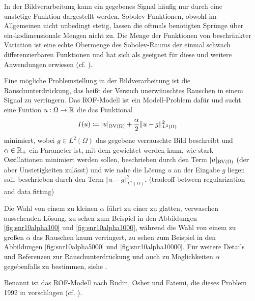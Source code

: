 In der Bildverarbeitung kann ein gegebenes Signal häufig nur durch eine
unstetige Funktion dargestellt werden.
Sobolev-Funktionen, obwohl im Allgemeinen nicht unbedingt stetig,
lassen die oftmals benötigten Sprünge über ein-kodimensionale Mengen nicht
zu. Die Menge der Funktionen von beschränkter Variation ist 
eine echte Obermenge des Sobolev-Raums der einmal schwach differenzierbaren 
Funktionen und hat sich als geeignet für diese und weitere Anwendungen erwiesen 
(cf. \cites[398]{ABM14}[42]{AK06}[297]{Bar15}[S. 1 f.]{Bra98}).


Eine mögliche Problemstellung in der Bildverarbeitung ist die 
Rauschunterdrück\-ung, das heißt der Versuch unerwünschtes Rauschen in einem
Signal zu verringern. Das ROF-Modell ist ein Modell-Problem dafür und sucht
eine Funtion $u:\Omega\to\mathbb{R}$ die das Funktional
\begin{align*}
  I(u)\coloneqq |u|_{\textup{BV}(\Omega)}+\frac{\alpha}{2}\Vert
  u-g\Vert_{L^2(\Omega)}^2
\end{align*}
minimiert,
wobei $g\in L^2(\Omega)$ das gegebene verrauschte Bild beschreibt und 
$\alpha\in \mathbb{R}_+$ ein Parameter ist, mit dem gewichtet werden kann, wie 
stark Oszillationen minimiert werden sollen, beschrieben durch den Term
$|u|_{\textup{BV}(\Omega)}$ (der aber Unstetigkeiten zulässt) und wie nahe die Lösung
$u$ an der Eingabe $g$ liegen soll, beschrieben durch den Term $\Vert
u-g\Vert_{L^2(\Omega)}^2$. (tradeoff between regularization and data fitting)

Die Wahl von einem zu kleinen $\alpha$ führt zu einer zu glatten, verwaschen
aussehenden Lösung, zu sehen zum Beispiel in den Abbildungen
\ref{fig:snr10alpha100} und \ref{fig:snr10alpha1000}, während die Wahl von
einem zu großen $\alpha$ das Rauschen kaum verringert, zu sehen zum Beispiel in
den Abbildungen \ref{fig:snr10alpha5000} und \ref{fig:snr10alpha10000}.
Für weitere Details und Referenzen zur Rauschunterdrückung und auch zu 
Möglichkeiten $\alpha$ gegebenfalls zu bestimmen, siehe \cite{Get12}.

Benannt ist das ROF-Modell nach Rudin, Osher und Fatemi, die dieses 
Problem 1992 in \cite{ROF92} vorschlugen 
(cf. \cites[1217]{Bar15a}[132]{CP10}[S. 74 f.]{Get12}).

